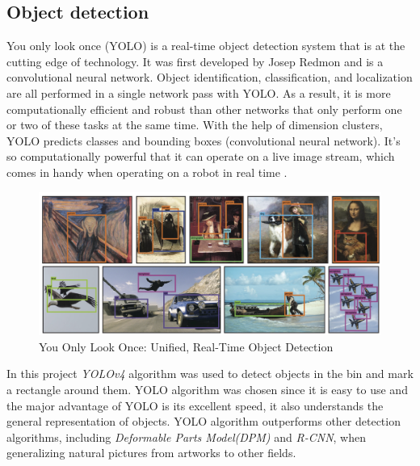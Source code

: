 \subsection{Object detection}\label{sec:yolo}


You only look once (YOLO) is a real-time object detection system that is at the cutting edge of technology. 
It was first developed by Josep Redmon and is a convolutional neural network.
Object identification, classification, and localization are all performed in a single network pass with YOLO. 
As a result, it is more computationally efficient and robust than other networks that only perform one or two of these tasks at the same time. 
With the help of dimension clusters, YOLO predicts classes and bounding boxes (convolutional neural network). 
It's so computationally powerful that it can operate on a live image stream, which comes in handy when operating on a robot in real time \cite{redmon_yolov3_2018}.
\begin{figure} [ht]
    \centering
    \includegraphics[width = 0.75 \textwidth]{graphics/yolo.PNG}
    \caption{You Only Look Once: Unified, Real-Time Object Detection \cite{redmon_you_2016}}
    \label{fig:yolo}
\end{figure}


In this project \textit{YOLOv4}\cite{bochkovskiy_yolov4_2020} algorithm was used to detect objects in the bin and mark a rectangle around them. 
YOLO algorithm was chosen since it is easy to use and the major advantage of YOLO is its excellent speed, it also understands the general representation of objects. YOLO algorithm outperforms other detection algorithms, including \textit{Deformable Parts Model(DPM)} and \textit{R-CNN}, when generalizing natural pictures from artworks to other fields\cite{zou_object_2019}.



